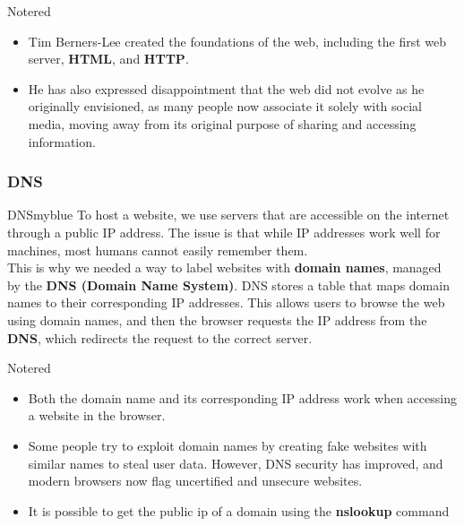\vspace{0.5cm}

\begin{prettyBox}{Note}{red}
\begin{itemize}
    \item Tim Berners-Lee created the foundations of the web, including the first web server,  
        \textbf{HTML}, and \textbf{HTTP}.
    \item He has also expressed disappointment that the web did not evolve as
he originally envisioned, as many people now associate it solely with social
media, moving away from its original purpose of sharing and accessing 
information.
\end{itemize}
\end{prettyBox}

\vspace{0.65cm}

\subsubsection{DNS}
\begin{prettyBox}{DNS}{myblue}
To host a website, we use servers that are accessible on the internet 
through a public IP address. The issue is that while IP addresses work
well for machines, most humans cannot easily remember them.\\[0.15cm]  
This is why we needed a way to label websites with \textbf{domain names},
managed by the \textbf{DNS (Domain Name System)}. DNS stores a table that maps 
domain names to their corresponding IP addresses. This allows users to browse
the web using domain names, and then the browser requests the IP address from
the \textbf{DNS}, which redirects the request to the correct server.
\end{prettyBox}

\vspace{0.3cm}

\begin{prettyBox}{Note}{red}
\begin{itemize}
    \item Both the domain name and its corresponding IP address work when  
        accessing a website in the browser.
    \item Some people try to exploit domain names by creating fake websites  
        with similar names to steal user data. However, DNS security has improved,  
        and modern browsers now flag uncertified and unsecure websites.
    \item It is possible to get the public ip of a domain using the \textbf{nslookup} command
\end{itemize}
\end{prettyBox}


